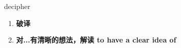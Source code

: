 
\begin{frame}
{\huge decipher}
\begin{center}
\begin{enumerate}\Large
  \item \textbf{破译}
  \item \textbf{对...有清晰的想法，解读 to have a clear idea of}
\end{enumerate}
\end{center}
\end{frame}
